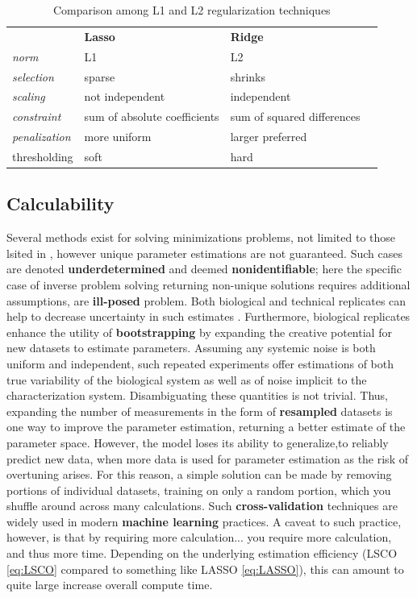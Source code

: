 \begin{table}[H]
\begin{tabular}{|l|l|l|l}
\cline{1-3}
 & \textbf{Lasso} &  \textbf{Ridge} &  \\ \cline{1-3}
\textit{norm} & L1 &  L2 &  \\ \cline{1-3}
\textit{selection} & sparse  & shrinks &  \\ \cline{1-3}
\textit{scaling} & not independent &  independent &  \\ \cline{1-3}
\textit{constraint} &sum of absolute coefficients& sum of squared differences&  \\ \cline{1-3}
\textit{penalization} & more uniform &  larger preferred &  \\ \cline{1-3}
thresholding & soft &  hard &  \\ \cline{1-3}
\end{tabular}
\caption{Comparison among L1 and L2 regularization techniques}
\label{table:regularization}
\end{table}

\subsection{Calculability}
\label{sec:calc}
Several methods exist for solving minimizations problems, not limited to those lsited in , however unique parameter estimations are not guaranteed. Such cases are denoted \textbf{underdetermined} and deemed \textbf{nonidentifiable}; here the specific case of inverse problem solving returning non-unique solutions requires additional assumptions, \ie are \textbf{ill-posed} problem. Both biological and technical replicates can help to decrease uncertainty in such estimates \citep{lee2000importance}. Furthermore, biological replicates enhance the utility of \textbf{bootstrapping} by expanding the creative potential for new datasets to estimate parameters. Assuming any systemic noise is both uniform and independent, such repeated experiments offer estimations of both true variability of the biological system as well as of noise implicit to the characterization system. Disambiguating these quantities is not trivial. Thus, expanding the number of measurements in the form of \textbf{resampled} datasets is one way to improve the parameter estimation, returning a better estimate of the parameter space. However, the model loses its ability to generalize,\ie to reliably predict new data, when more data is used for parameter estimation as the risk of overtuning arises. For this reason, a simple solution can be made by removing portions of individual datasets, training on only a random portion, which you shuffle around across many calculations. Such \textbf{cross-validation} techniques are widely used in modern \textbf{machine learning} practices. A caveat to such practice, however, is that by requiring more calculation... you require more calculation, and thus more time. Depending on the underlying estimation efficiency (LSCO \cref{eq:LSCO} compared to something like LASSO \cref{eq:LASSO}), this can amount to quite large increase overall compute time.


